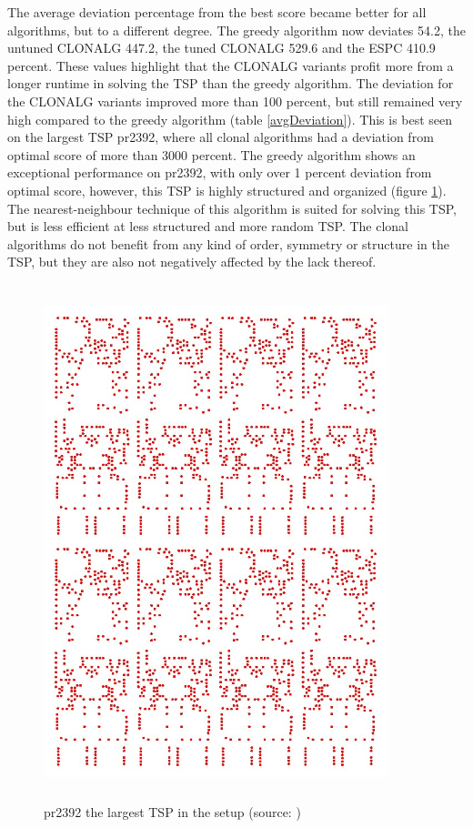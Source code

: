 \newpage
The average deviation percentage from the best score became better for all algorithms, but to a different degree. The greedy algorithm now deviates 54.2, the untuned CLONALG 447.2, the tuned CLONALG 529.6 and the ESPC 410.9 percent. These values highlight that the CLONALG variants profit more from a longer runtime in solving the TSP than the greedy algorithm. The deviation for the CLONALG variants improved more than 100 percent, but still remained very high compared to the greedy algorithm (table \ref{avgDeviation}). This is best seen on the largest TSP pr2392, where all clonal algorithms had a deviation from optimal score of more than 3000 percent. The greedy algorithm shows an exceptional performance on pr2392, with only over 1 percent deviation from optimal score, however, this TSP is highly structured and organized (figure \ref{pr2392}). The nearest-neighbour technique of this algorithm is suited for solving this TSP, but is less efficient at less structured and more random TSP. The clonal algorithms do not benefit from any kind of order, symmetry or structure in the TSP, but they are also not negatively affected by the lack thereof. 
\begin{figure}[H]
	\includegraphics[width=10cm, height=15cm]{Images/pr2392.jpg}
	\caption{pr2392 the largest TSP in the setup (source: \cite{pr2392})}
	\label{pr2392}
\end{figure}
